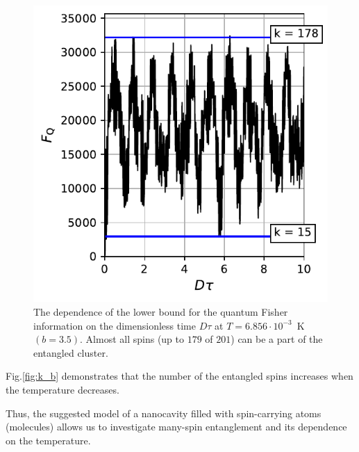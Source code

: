 \documentclass[%
 reprint,
superscriptaddress,
 amsmath,amssymb,
]{revtex4-2}
\begin{document}
\begin{figure}
    \centering
    \includegraphics{m2_t_b3_5.pdf}
    \caption{The dependence of the lower bound for the quantum Fisher information on the dimensionless time $D\tau$ at ${T=6.856\cdot10^{-3}}$~K $(b=3.5)$.
    Almost all spins (up to $179$ of $201$) can be a part of the entangled cluster.}
    \label{fig:m2_t_b3.5}
\end{figure}
\par 
Fig.\ref{fig:k_b} demonstrates that the number of the entangled spins increases when the temperature decreases.
\par
Thus, the suggested model of a nanocavity filled with spin-carrying atoms (molecules) allows us to investigate many-spin entanglement and its dependence on the temperature.
\end{document}
